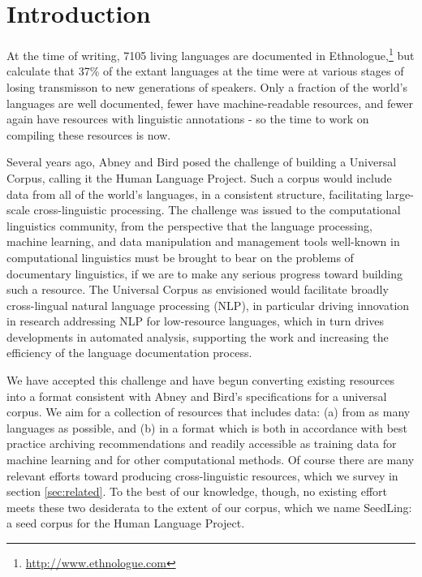 \section{Introduction} \label{sec:intro}

At the time of writing, 7105 living languages are documented in Ethnologue,\footnote{\url{http://www.ethnologue.com}} but  calculate that 37\% of the extant languages at the time were at various stages of losing transmisson to new generations of speakers.
Only a fraction of the world's languages are well documented, fewer have machine-readable resources, and fewer again have resources with linguistic annotations \cite{maxwell2006annotation} - so the time to work on compiling these resources is now.

Several years ago, Abney and Bird  posed the challenge of building a Universal Corpus, calling it the Human Language Project. Such a corpus would include data from all of the world's languages, in a consistent structure, facilitating large-scale cross-linguistic processing. The challenge was issued to the computational linguistics community, from the perspective that the language processing, machine learning, and data manipulation and management tools well-known in computational linguistics must be brought to bear on the problems of documentary linguistics, if we are to make any serious progress toward building such a resource. The Universal Corpus as envisioned would facilitate broadly cross-lingual natural language processing (NLP), in particular driving innovation in research addressing NLP for low-resource languages, which in turn drives developments in automated analysis, supporting the work and increasing the efficiency of the language documentation process. 

We have accepted this challenge and have begun converting existing resources into a format consistent with Abney and Bird's specifications for a universal corpus. We aim for a collection of resources that includes data: (a) from as many languages as possible, and (b) in a format which is both in accordance with best practice archiving recommendations and readily accessible as training data for machine learning and for other computational methods. Of course there are many relevant efforts toward producing cross-linguistic resources, which we survey in section \ref{sec:related}. To the best of our knowledge, though, no existing effort meets these two desiderata to the extent of our corpus, which we name SeedLing: a seed corpus for the Human Language Project.

